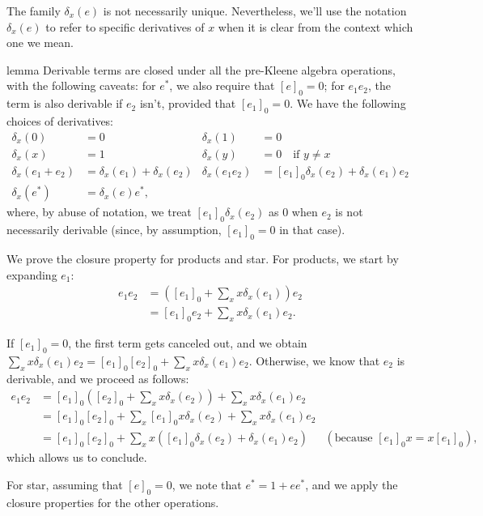 \documentclass[11pt,a4paper]{amsart}
\theoremstyle{definition}
\begin{document}
The family $ \delta _x(e)$ is not necessarily unique.  Nevertheless, we'll use the
notation $ \delta _x(e)$ to refer to specific derivatives of $x$ when it is clear from
the context which one we mean.

\begin{theoremEnd}{lemma}
  \label{lem:derivable-closure}
  Derivable terms are closed under all the pre-Kleene algebra operations, with
  the following caveats: for $e^*$, we also require that $[e]_0 = 0$; for
  $e_1e_2$, the term is also derivable if $e_2$ isn't, provided that
  $[e_1]_0=0$.  We have the following choices of derivatives:
  \begin{align*}
     \delta _x(0) & = 0 &
     \delta _x(1) & = 0 \\
     \delta _x(x) & = 1 &
     \delta _x(y) & = 0 \quad \text{if $y  \neq  x$} \\
     \delta _x(e_1 + e_2) & =  \delta _x(e_1) +  \delta _x(e_2) &
     \delta _x(e_1e_2) & = [e_1]_0 \delta _x(e_2) +  \delta _x(e_1)e_2 \\
     \delta _x(e^*) & =  \delta _x(e)e^*,
  \end{align*}
  where, by abuse of notation, we treat $[e_1]_0 \delta _x(e_2)$ as 0 when $e_2$ is not
  necessarily derivable (since, by assumption, $[e_1]_0 = 0$ in that case).
\end{theoremEnd}

\begin{proofEnd} %
%
  We prove the closure property for products and star. For products, we start by
  expanding $e_1$:
  \begin{align*}
    e_1e_2
    & = \left([e_1]_0 +  \sum _x x \delta _x(e_1)\right)e_2 \\
    & = [e_1]_0e_2 +  \sum _x x \delta _x(e_1)e_2.
  \end{align*}

  If $[e_1]_0=0$, the first term gets canceled out, and we obtain
  $ \sum _xx \delta _x(e_1)e_2 = [e_1]_0[e_2]_0 +  \sum _xx \delta _x(e_1)e_2$.  Otherwise, we know that
  $e_2$ is derivable, and we proceed as follows:
  \begin{align*}
    e_1e_2
    & = [e_1]_0\left([e_2]_0 +  \sum _x x  \delta _x(e_2)\right) +  \sum _x x \delta _x(e_1)e_2 \\
    & = [e_1]_0[e_2]_0 +  \sum _x [e_1]_0 x  \delta _x(e_2) +  \sum _x x \delta _x(e_1)e_2 \\
    & = [e_1]_0[e_2]_0 +  \sum _x x ([e_1]_0 \delta _x(e_2) +  \delta _x(e_1)e_2)
    & (\text{because $[e_1]_0x = x[e_1]_0$}),
  \end{align*}
  which allows us to conclude.

  For star, assuming that $[e]_0 = 0$, we note that $e^* = 1 + ee^*$, and we
  apply the closure properties for the other operations. %
\end{proofEnd}
\end{document}
